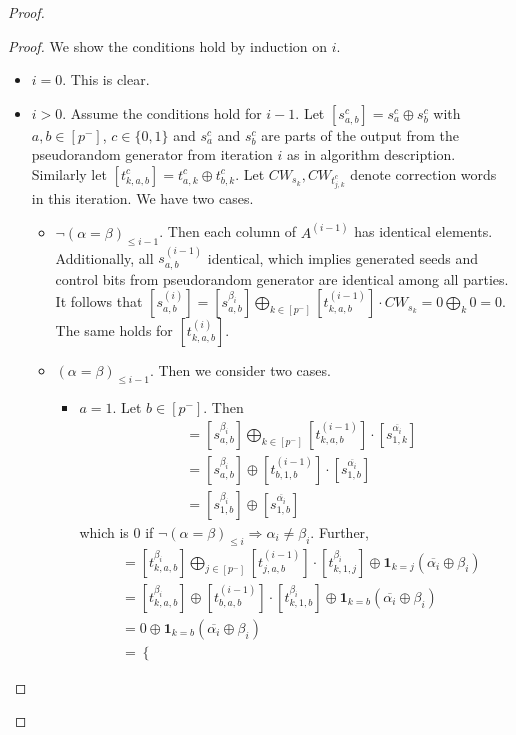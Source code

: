 \documentclass[11pt]{article}
\begin{document}
\begin{proof}
\begin{proof}
We show the conditions hold by induction on $i$.
\begin{itemize}
\item $i = 0$. This is clear.
\item $i > 0$. Assume the conditions hold for $i - 1$. Let $[s_{a,b}^c] = s_a^c \oplus s_b^c$ with $a,b \in [p^-]$, $c \in \{0,1\}$ and $s_a^c$ and $s_b^c$ are parts of the output from the pseudorandom generator from iteration $i$ as in algorithm description. Similarly let $[t_{k,a,b}^c] = t_{a,k}^c \oplus t_{b,k}^c$. Let $CW_{s_k}, CW_{t_{j,k}^c}$ denote correction words in this iteration. We have two cases.
\begin{itemize}
  \item $\lnot (\alpha = \beta)_{\le i-1}$. Then each column of $A^{(i-1)}$ has identical elements. Additionally, all $s_{a,b}^{(i-1)}$ identical, which implies generated seeds and control bits from pseudorandom generator are identical among all parties. It follows that $[s_{a,b}^{(i)}] = [s_{a,b}^{\beta_i}] \bigoplus_{k \in [p^-]} [t_{k,a,b}^{(i-1)}] \cdot CW_{s_k} = 0 \bigoplus_k 0 = 0$. The same holds for $[t_{k,a,b}^{(i)}]$.
  \item $(\alpha = \beta)_{\le i-1}$. Then we consider two cases.
  \begin{itemize}
    \item $a = 1$. Let $b \in [p^-]$. Then 
    \begin{align*} 
      [s_{a,b}^{(i)}] &= [s_{a,b}^{\beta_i}] \bigoplus_{k \in [p^-]} [t_{k,a,b}^{(i-1)}] \cdot [s_{1,k}^{\overline{\alpha_i}}]\\
      &= [s_{a,b}^{\beta_i}] \oplus [t_{b,1,b}^{(i-1)}] \cdot [s_{1,b}^{\overline{\alpha_i}}]\\
      &= [s_{1,b}^{\beta_i}] \oplus [s_{1,b}^{\overline{\alpha_i}}]
    \end{align*}
    which is 0 if $\lnot (\alpha = \beta)_{\le i} \Rightarrow \alpha_i \neq \beta_i$. Further,
    \begin{align*}
      [t_{k,a,b}^{(i)}] &= [t_{k,a,b}^{\beta_i}] \bigoplus_{j \in [p^-]} [t_{j,a,b}^{(i-1)}] \cdot [t_{k,1,j}^{\beta_i}] \oplus \mathbf{1}_{k = j}(\overline{\alpha_i} \oplus \beta_i)\\
      &= [t_{k,a,b}^{\beta_i}] \oplus [t_{b,a,b}^{(i-1)}] \cdot [t_{k,1,b}^{\beta_i}] \oplus \mathbf{1}_{k = b}(\overline{\alpha_i} \oplus \beta_i)\\
      &= 0 \oplus \mathbf{1}_{k = b}(\overline{\alpha_i} \oplus \beta_i)\\
      &= \begin{cases}

\end{cases}
\end{align*}
\end{itemize}
\end{itemize}
\end{itemize}
\end{proof}
\end{proof}
\end{document}
